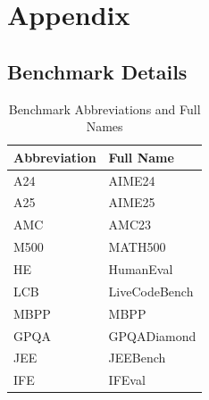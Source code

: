 \section{Appendix}
\subsection{Benchmark Details}
\begin{table}[ht]
\centering
\caption{Benchmark Abbreviations and Full Names}
\label{tab:benchmark_mapping}
\scriptsize
\begin{tabular}{ll}
\toprule
\textbf{Abbreviation} & \textbf{Full Name} \\
\midrule
A24 & AIME24 \\
A25 & AIME25 \\
AMC & AMC23 \\
M500 & MATH500 \\
HE & HumanEval \\
LCB & LiveCodeBench \\
MBPP & MBPP \\
GPQA & GPQADiamond \\
JEE & JEEBench \\
IFE & IFEval \\
\bottomrule
\end{tabular}
\end{table}

